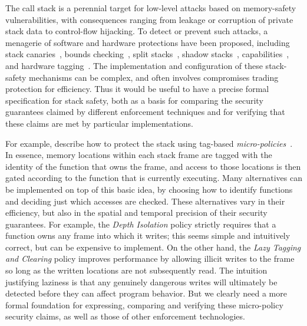 \documentclass[acmsmall,review,anonymous]{acmart}\settopmatter{printfolios=true,printccs=false,printacmref=false}
\begin{document}
The call stack is a perennial target for low-level attacks
based on memory-safety vulnerabilities, with consequences
ranging from leakage or corruption of private stack data to
control-flow hijacking. To detect or prevent such attacks, a menagerie of
software and hardware protections have been proposed,
%
including stack canaries~\citep{Cowan+98},
bounds checking~\citep{NagarakatteZMZ09,NagarakatteZMZ10,DeviettiBMZ08},
split stacks~\citep{Kuznetsov+14},
shadow stacks~\citep{Dang+15,Shanbhogue+19},
capabilities~\citep{Woodruff+14,Chisnall+15,Skorstengaard+19,Skorstengaard+19b,Tsampas+19,Georges+21},
and hardware tagging~\citep{DBLP:conf/sp/RoesslerD18}. \ifaftersubmission{}
\fi
%
The implementation and configuration of these  stack-safety mechanisms can be complex,
and often involves compromises trading protection for efficiency.
Thus it would be useful to have a precise formal specification for stack
safety, both as a basis for comparing the security guarantees claimed by different enforcement
techniques and for verifying that these claims are met by particular implementations.

For example, \citet{DBLP:conf/sp/RoesslerD18} describe how to protect the stack
using tag-based \emph{micro-policies}~\citep{pump_oakland2015}.
In essence, memory locations within each stack frame are tagged with the identity of
the function that owns the frame, and access to those locations is then gated
according to the function that is currently executing. Many alternatives can
be implemented on top of this basic idea, by choosing how to identify functions
and deciding just which accesses are checked.  These alternatives vary in their
efficiency, but also in the spatial and temporal precision of their security guarantees.
For example, the \emph{Depth Isolation} policy strictly requires that a function owns any
frame into which it writes; this seems simple and intuitively correct, but can be expensive to implement.
On the other hand, the \emph{Lazy Tagging and Clearing} policy improves performance by
allowing illicit writes to the frame so long as the written locations are not
subsequently read. The intuition justifying laziness is that any genuinely dangerous writes will ultimately be
detected before they can affect program behavior.  But we clearly need a more formal foundation for
expressing, comparing and verifying these micro-policy security claims, as well as those of
other enforcement technologies.
\end{document}
